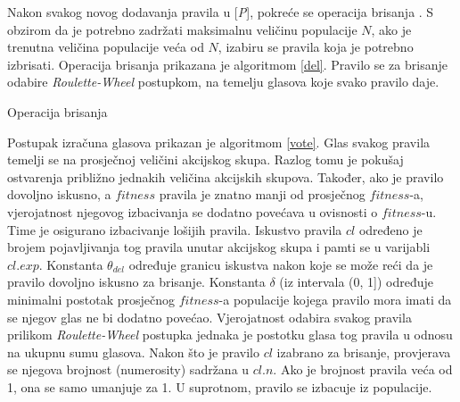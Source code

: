 \documentclass[times, utf8, zavrsni]{fer}
\begin{document}
Nakon svakog novog dodavanja pravila u [\emph{P}], pokreće se operacija brisanja \citep{1}.
S obzirom da je potrebno zadržati maksimalnu veličinu populacije $N$, ako je trenutna veličina populacije veća od $N$, izabiru se pravila koja je potrebno izbrisati.
Operacija brisanja prikazana je algoritmom \ref{del}.
Pravilo se za brisanje odabire \emph{Roulette-Wheel} postupkom, na temelju glasova koje svako pravilo daje.
\begin{algorithm}
    \caption{Operacija brisanja}
    \label{del}
    \begin{algorithmic}
        \RETURN
        \ENDIF
        \ENDFOR
        \STATE{$r$ := proizvoljan decimalni broj iz intervala [0, 1)}
        \ELSE
        \ENDIF
        \RETURN
        \ENDIF
        \ENDFOR
    \end{algorithmic}
\end{algorithm}
Postupak izračuna glasova prikazan je algoritmom \ref{vote}.
Glas svakog pravila temelji se na prosječnoj veličini akcijskog skupa.
Razlog tomu je pokušaj ostvarenja približno jednakih veličina akcijskih skupova.
Također, ako je pravilo dovoljno iskusno, a $fitness$ pravila je znatno manji od prosječnog $fitness$-a, vjerojatnost njegovog izbacivanja se dodatno povećava u ovisnosti o $fitness$-u.
Time je osigurano izbacivanje lošijih pravila.
Iskustvo pravila $cl$ određeno je brojem pojavljivanja tog pravila unutar akcijskog skupa i pamti se u varijabli $cl.exp$.
Konstanta $\theta_{del}$ određuje granicu iskustva nakon koje se može reći da je pravilo dovoljno iskusno za brisanje.
Konstanta $\delta$ (iz intervala (0, 1]) određuje minimalni postotak prosječnog $fitness$-a populacije kojega pravilo mora imati da se njegov glas ne bi dodatno povećao.
Vjerojatnost odabira svakog pravila prilikom \emph{Roulette-Wheel} postupka jednaka je postotku glasa tog pravila u odnosu na ukupnu sumu glasova.
Nakon što je pravilo $cl$ izabrano za brisanje, provjerava se njegova brojnost \engl(numerosity) sadržana u $cl.n$.
Ako je brojnost pravila veća od 1, ona se samo umanjuje za 1.
U suprotnom, pravilo se izbacuje iz populacije.
\end{document}
